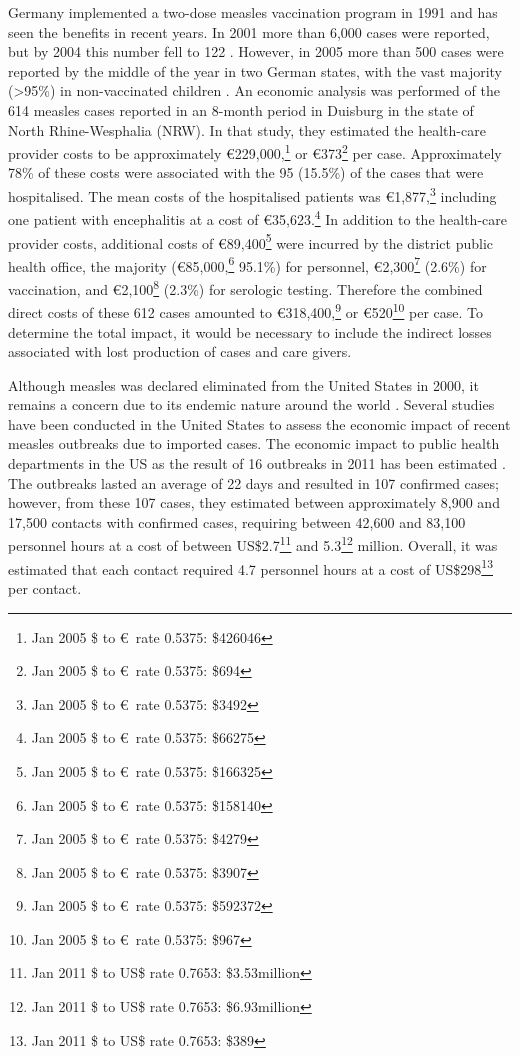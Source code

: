 \documentclass{article}
\begin{document}
Germany implemented a two-dose measles vaccination program in 1991 and has seen the benefits in recent years. In 2001 more than 6,000 cases were reported, but by 2004 this number fell to 122 \citep{wichmann9}. However, in 2005 more than 500 cases were reported by the middle of the year in two German states, with the vast majority (>95\%) in non-vaccinated children \citep{siedler6}. An economic analysis was performed of the 614 measles cases reported in an 8-month period in Duisburg in the state of North Rhine-Wesphalia (NRW). In that study, they estimated the health-care provider costs to be approximately \euro 229,000,\footnote{Jan 2005 \$ to \euro\ rate 0.5375: \$426046} or \euro 373\footnote{Jan 2005 \$ to \euro\ rate 0.5375: \$694} per case. Approximately 78\% of these costs were associated with the 95 (15.5\%) of the cases that were hospitalised. The mean costs of the hospitalised patients was  \euro 1,877,\footnote{Jan 2005 \$ to \euro\ rate 0.5375: \$3492} including one patient with encephalitis at a cost of \euro 35,623.\footnote{Jan 2005 \$ to \euro\ rate 0.5375: \$66275} In addition to the health-care provider costs, additional costs of \euro 89,400\footnote{Jan 2005 \$ to \euro\ rate 0.5375: \$166325} were incurred by the district public health office, the majority (\euro 85,000,\footnote{Jan 2005 \$ to \euro\ rate 0.5375: \$158140} 95.1\%) for personnel, \euro 2,300\footnote{Jan 2005 \$ to \euro\ rate 0.5375: \$4279} (2.6\%) for vaccination, and \euro 2,100\footnote{Jan 2005 \$ to \euro\ rate 0.5375: \$3907} (2.3\%) for serologic testing. Therefore the combined direct costs of these 612 cases amounted to \euro 318,400,\footnote{Jan 2005 \$ to \euro\ rate 0.5375: \$592372} or \euro 520\footnote{Jan 2005 \$ to \euro\ rate 0.5375: \$967} per case. To determine the total impact, it would be necessary to include the indirect losses associated with lost production of cases and care givers.

Although measles was declared eliminated from the United States in 2000, it remains a concern due to its endemic nature around the world \citep{parker6}. Several studies have been conducted in the United States to assess the economic impact of recent measles outbreaks due to imported cases.  The economic impact to public health departments in the US as the result of 16 outbreaks in 2011 has been estimated \citep{ortegasanchez14}. The outbreaks lasted an average of 22 days and resulted in 107 confirmed cases; however, from these 107 cases, they estimated between approximately 8,900 and 17,500 contacts with confirmed cases, requiring between 42,600 and 83,100 personnel hours at a cost of between US\$2.7\footnote{Jan 2011 \$ to US\$ rate 0.7653: \$3.53million} and 5.3\footnote{Jan 2011 \$ to US\$ rate 0.7653: \$6.93million} million. Overall, it was estimated that each contact required 4.7 personnel hours at a cost of US\$298\footnote{Jan 2011 \$ to US\$ rate 0.7653: \$389} per contact.
\end{document}
